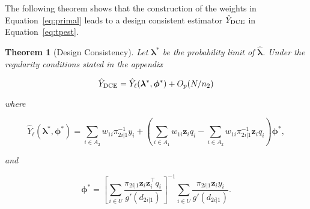 \documentclass[12pt]{article}
\newtheorem{theorem}{Theorem}
\newcommand{\bx}{\mathbf{x}}
\renewcommand{\bf}[1]{\mathbf{#1}}
\begin{document}
The following theorem shows that the construction of the weights in
Equation~\ref{eq:primal} leads to a design consistent estimator 
$\hat Y_{\rm DCE}$ in Equation~\ref{eq:tpest}.

\begin{theorem}[Design Consistency]\label{thm:dc1}
  Let $\bm \lambda^*$ be the probability limit of $\hat{\bm \lambda}$. 
  Under the regularity conditions stated in the appendix

  $$
  \hat Y_{\rm DCE} = \hat Y_\ell(\bm{\lambda}^*, \bm \phi^*) + O_p(N / n_2)
  $$

  where

  $$
  \hat Y_{\ell}(\bm \lambda^*, \bm \phi^*) = 
  \sum_{i \in A_2} w_{1i} \pi_{2i|1}^{-1} y_i
  + \left(\sum_{i \in A_1} w_{1i} \bf z_i q_i - 
  \sum_{i \in A_2} w_{1i} \pi_{2i|1}^{-1} \bf{z}_i q_i\right)\bm \phi^*,
  $$

  and

  $$
  \bm \phi^* = 
  \left[\sum_{i \in U} \frac{\pi_{2i|1}\bf z_i \bf z_i^\top q_i}{g'(d_{2i|1})}\right]^{-1}
  \sum_{i \in U} \frac{\pi_{2i|1}\bf z_i y_i}{g'(d_{2i|1})}.
  $$

%

\end{theorem}
\end{document}
